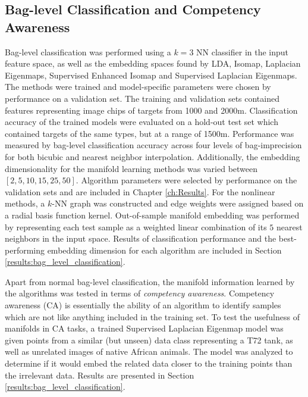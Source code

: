 \subsection{Bag-level Classification and Competency Awareness}
Bag-level classification was performed using a $k=3$ NN classifier in the input feature space, as well as the embedding spaces found by LDA, Isomap, Laplacian Eigenmaps, Supervised Enhanced Isomap and Supervised Laplacian Eigenmaps. The methods were trained and model-specific parameters were chosen by performance on a validation set.  The training and validation sets contained features representing image chips of targets from 1000 and 2000m.  Classification accuracy of the trained models were evaluated on a hold-out test set which contained targets of the same types, but at a range of 1500m. Performance was measured by bag-level classification accuracy across four levels of bag-imprecision for both bicubic and nearest neighbor interpolation.  Additionally, the embedding dimensionality for the manifold learning methods was varied between $[2,5,10,15,25,50]$.  Algorithm parameters were selected by performance on the validation sets and are included in Chapter \ref{ch:Results}. For the nonlinear methods, a $k$-NN graph was constructed and edge weights were assigned based on a radial basis function kernel. Out-of-sample manifold embedding was performed by representing each test sample as a weighted linear combination of its $5$ nearest neighbors in the input space.   Results of classification performance and the best-performing embedding dimension for each algorithm are included in Section  \ref{results:bag_level_classification}.

Apart from normal bag-level classification, the manifold information learned by the algorithms was tested in terms of \textit{competency awareness}.  Competency awareness (CA) is essentially the ability of an algorithm to identify samples which are not like anything included in the training set.  To test the usefulness of manifolds in CA tasks, a trained Supervised Laplacian Eigenmap model was given points from a similar (but unseen) data class representing a T72 tank, as well as unrelated images of native African animals.  The model was analyzed to determine if it would embed the related data closer to the training points than the irrelevant data.  Results are presented in Section \ref{results:bag_level_classification}.

